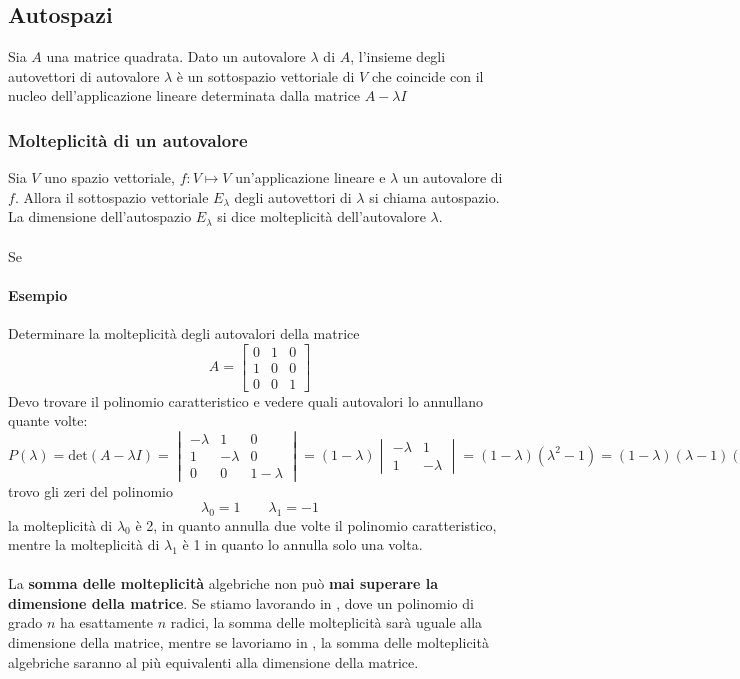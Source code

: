 \documentclass[italian]{article}
\newcommand{\ins}[1]{\text{$\mathbb{#1}$}}
\renewcommand{\det}[1]{\text{det$\left(#1\right)$}}
\begin{document}
\subsection{Autospazi}
Sia $A$ una matrice quadrata. Dato un autovalore $\lambda$ di $A$, l'insieme degli
autovettori di autovalore $\lambda$ è un sottospazio vettoriale di $V$ che coincide con il nucleo dell'applicazione lineare determinata dalla matrice $A - \lambda I$

\subsubsection{Molteplicità di un autovalore}
Sia $V$ uno spazio vettoriale, $f: V \longmapsto V$ un'applicazione lineare e $\lambda$ un autovalore di $f$. Allora il sottospazio vettoriale $E_\lambda$ degli autovettori di $\lambda$ si chiama autospazio. La dimensione dell'autospazio $E_\lambda$ si dice molteplicità dell'autovalore $\lambda$.\\\\
Se

\paragraph{Esempio} Determinare la molteplicità degli autovalori della matrice 
\[
	A = 
	\begin{bmatrix}
		0 & 1 & 0 \\
		1 & 0 & 0 \\
		0 & 0 & 1
	\end{bmatrix}
\]
Devo trovare il polinomio caratteristico e vedere quali autovalori lo annullano quante volte:
\[
	P(\lambda) = \det{A - \lambda I} = 
	\begin{vmatrix}
		-\lambda & 1 & 0 \\
		1 & -\lambda & 0 \\
		0 & 0 & 1-\lambda
	\end{vmatrix}
	=
	(1-\lambda)
	\begin{vmatrix}
		-\lambda & 1 \\
		1 & -\lambda
	\end{vmatrix}
	=
	(1-\lambda)(\lambda^2 - 1)
	=
	(1-\lambda)(\lambda - 1)(\lambda + 1)
\]
trovo gli zeri del polinomio
\[
	\lambda_0 = 1 \qquad \lambda_1 = -1
\]
la molteplicità di $\lambda_0$ è 2, in quanto annulla due volte il polinomio caratteristico, mentre la molteplicità di $\lambda_1$ è 1 in quanto lo annulla solo una volta.\\\\
La \textbf{somma delle molteplicità} algebriche non può \textbf{mai superare la dimensione della matrice}. Se stiamo lavorando in \ins{C}, dove un polinomio di grado $n$ ha esattamente $n$ radici, la somma delle molteplicità sarà uguale alla dimensione della matrice, mentre se lavoriamo in \ins{R}, la somma delle molteplicità algebriche saranno al più equivalenti alla dimensione della matrice.
\end{document}
